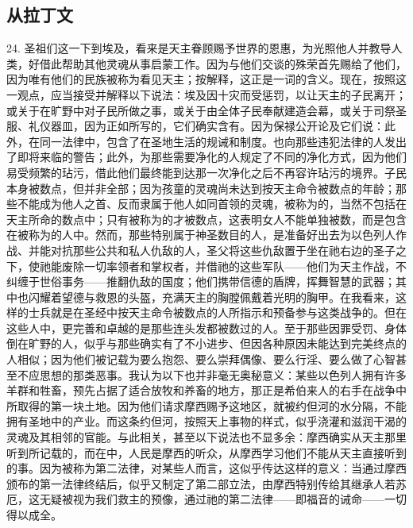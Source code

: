 
\subsection{从拉丁文}

24. 圣祖们这一下到埃及，看来是天主眷顾赐予世界的恩惠，为光照他人并教导人类，好借此帮助其他灵魂从事启蒙工作。因为与他们交谈的殊荣首先赐给了他们，因为唯有他们的民族被称为看见天主；按解释，这正是一词的含义。现在，按照这一观点，应当接受并解释以下说法：埃及因十灾而受惩罚，以让天主的子民离开；或关于在旷野中对子民所做之事，或关于由全体子民奉献建造会幕，或关于司祭圣服、礼仪器皿，因为正如所写的，它们确实含有。因为保禄公开论及它们说：此外，在同一法律中，包含了在圣地生活的规诫和制度。也向那些违犯法律的人发出了即将来临的警告；此外，为那些需要净化的人规定了不同的净化方式，因为他们易受频繁的玷污，借此他们最终能到达那一次净化之后不再容许玷污的境界。子民本身被数点，但并非全部；因为孩童的灵魂尚未达到按天主命令被数点的年龄；那些不能成为他人之首、反而隶属于他人如同首领的灵魂，被称为的，当然不包括在天主所命的数点中；只有被称为的才被数点，这表明女人不能单独被数，而是包含在被称为的人中。然而，那些特别属于神圣数目的人，是准备好出去为以色列人作战、并能对抗那些公共和私人仇敌的人，圣父将这些仇敌置于坐在祂右边的圣子之下，使祂能废除一切率领者和掌权者，并借祂的这些军队——他们为天主作战，不纠缠于世俗事务——推翻仇敌的国度；他们携带信德的盾牌，挥舞智慧的武器；其中也闪耀着望德与救恩的头盔，充满天主的胸膛佩戴着光明的胸甲。在我看来，这样的士兵就是在圣经中按天主命令被数点的人所指示和预备参与这类战争的。但在这些人中，更完善和卓越的是那些连头发都被数过的人。至于那些因罪受罚、身体倒在旷野的人，似乎与那些确实有了不小进步、但因各种原因未能达到完美终点的人相似；因为他们被记载为要么抱怨、要么崇拜偶像、要么行淫、要么做了心智甚至不应思想的那类恶事。我认为以下也并非毫无奥秘意义：某些以色列人拥有许多羊群和牲畜，预先占据了适合放牧和养畜的地方，那正是希伯来人的右手在战争中所取得的第一块土地。因为他们请求摩西赐予这地区，就被约但河的水分隔，不能拥有圣地中的产业。而这条约但河，按照天上事物的样式，似乎浇灌和滋润干渴的灵魂及其相邻的官能。与此相关，甚至以下说法也不显多余：摩西确实从天主那里听到所记载的，而在中，人民是摩西的听众，从摩西学习他们不能从天主直接听到的事。因为被称为第二法律，对某些人而言，这似乎传达这样的意义：当通过摩西颁布的第一法律终结后，似乎又制定了第二部立法，由摩西特别传给其继承人若苏厄，这无疑被视为我们救主的预像，通过祂的第二法律——即福音的诫命——一切得以成全。\par

